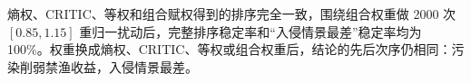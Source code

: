 熵权、CRITIC、等权和组合赋权得到的排序完全一致，围绕组合权重做 2000 次 $[0.85,1.15]$ 重归一扰动后，完整排序稳定率和“入侵情景最差”稳定率均为 100\%。权重换成熵权、CRITIC、等权或组合权重后，结论的先后次序仍相同：污染削弱禁渔收益，入侵情景最差。
